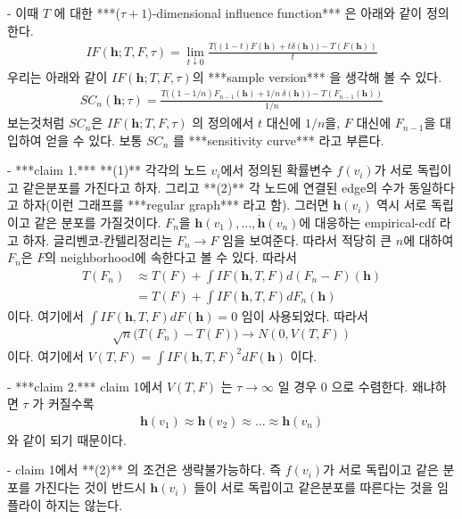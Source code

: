 \documentclass[preprint, review, 12pt]{article}
\theoremstyle{definition}
\theoremstyle{remark}
\begin{document}
- 이때 $T$ 에 대한 ***($\tau+1$)-dimensional influence function*** 은 아래와 같이 정의한다. 
\begin{align}
IF({\boldsymbol h}; T,F,\tau)= \lim_{t\downarrow 0}\frac{T\Big((1-t)F(\boldsymbol{h}) + t \delta(\boldsymbol{h}) \Big)-T(F(\boldsymbol{h}))}{t}
\end{align}
우리는 아래와 같이 $IF({\boldsymbol h}; T,F,\tau)$의 ***sample version*** 을 생각해 볼 수 있다. 
\begin{align}
SC_{n}({\boldsymbol h};\tau)= \frac{T\Big((1-1/n)F_{n-1}(\boldsymbol{h}) + 1/n ~ \delta(\boldsymbol{h}) \Big)-T(F_{n-1}(\boldsymbol{h}))}{1/n}
\end{align}
보는것처럼 $SC_{n}$은 $IF({\boldsymbol h}; T,F,\tau)$ 의 정의에서 $t$ 대신에 $1/n$을, $F$ 대신에 $F_{n-1}$을 대입하여 얻을 수 있다. 보통 $SC_{n}$ 를 ***sensitivity curve*** 라고 부른다. 

- ***claim 1.*** **(1)** 각각의 노드 $v_i$에서 정의된 확률변수 $f(v_i)$가 서로 독립이고 같은분포를 가진다고 하자. 그리고 **(2)** 각 노드에 연결된 edge의 수가 동일하다고 하자(이런 그래프를 ***regular graph*** 라고 함). 그러면 $\boldsymbol{h}(v_i)$ 역시 서로 독립이고 같은 분포를 가질것이다. $F_n$을 $\boldsymbol{h}(v_1),\dots,\boldsymbol{\dot h}(v_n)$에 대응하는 empirical-cdf 라고 하자. 글리벤코-칸텔리정리는 $F_n \to F$ 임을 보여준다. 따라서 적당히 큰 $n$에 대하여 $F_n$은 $F$의 neighborhood에 속한다고 볼 수 있다. 따라서 
\begin{align}
T(F_n) & \approx  T(F)+\int IF(\boldsymbol{h},T,F)d(F_n-F)(\boldsymbol{h}) \\
& = T(F)+\int IF(\boldsymbol{h},T,F) dF_n(\boldsymbol{h}) 
\end{align}
이다. 여기에서 $\int IF(\boldsymbol{h},T,F)dF(\boldsymbol{h})=0$ 임이 사용되었다. 따라서 
\begin{align}
\sqrt{n}\Big(T(F_n)-T(F) \Big) \to N(0,V(T,F))
\end{align}
이다. 여기에서 $V(T,F)=\int IF(\boldsymbol{h},T,F)^2 dF(\boldsymbol{h})$ 이다. 

- ***claim 2.*** claim 1에서 $V(T,F)$ 는 $\tau \to \infty$ 일 경우 $0$ 으로 수렴한다. 왜냐하면 $\tau$ 가 커질수록 
\begin{align}
\boldsymbol{h}(v_1)\approx \boldsymbol{h}(v_2) \approx \dots \approx \boldsymbol{h}(v_n)
\end{align}
와 같이 되기 때문이다. 

- claim 1에서 **(2)** 의 조건은 생략불가능하다. 즉 $f(v_i)$가 서로 독립이고 같은 분포를 가진다는 것이 반드시 $\boldsymbol{h}(v_i)$ 들이 서로 독립이고 같은분포를 따른다는 것을 임플라이 하지는 않는다. 
\end{document}
